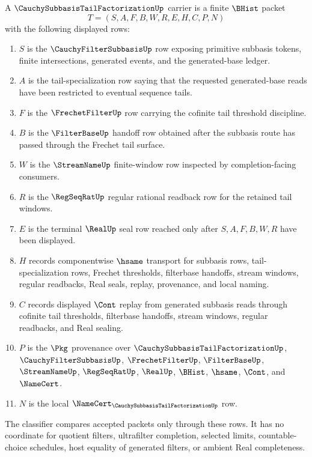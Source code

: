 \begin{definition}
\label{def:cauchy-subbasis-tail-factorization-carrier}
A $\CauchySubbasisTailFactorizationUp$ carrier is a finite $\BHist$ packet
$$
T=(S,A,F,B,W,R,E,H,C,P,N)
$$
with the following displayed rows:
\begin{enumerate}
\item $S$ is the $\CauchyFilterSubbasisUp$ row exposing primitive subbasis tokens, finite intersections, generated events, and the generated-base ledger.
\item $A$ is the tail-specialization row saying that the requested generated-base reads have been restricted to eventual sequence tails.
\item $F$ is the $\FrechetFilterUp$ row carrying the cofinite tail threshold discipline.
\item $B$ is the $\FilterBaseUp$ handoff row obtained after the subbasis route has passed through the Frechet tail surface.
\item $W$ is the $\StreamNameUp$ finite-window row inspected by completion-facing consumers.
\item $R$ is the $\RegSeqRatUp$ regular rational readback row for the retained tail windows.
\item $E$ is the terminal $\RealUp$ seal row reached only after $S,A,F,B,W,R$ have been displayed.
\item $H$ records componentwise $\hsame$ transport for subbasis rows, tail-specialization rows, Frechet thresholds, filterbase handoffs, stream windows, regular readbacks, Real seals, replay, provenance, and local naming.
\item $C$ records displayed $\Cont$ replay from generated subbasis reads through cofinite tail thresholds, filterbase handoffs, stream windows, regular readbacks, and Real sealing.
\item $P$ is the $\Pkg$ provenance over $\CauchySubbasisTailFactorizationUp$, $\CauchyFilterSubbasisUp$, $\FrechetFilterUp$, $\FilterBaseUp$, $\StreamNameUp$, $\RegSeqRatUp$, $\RealUp$, $\BHist$, $\hsame$, $\Cont$, and $\NameCert$.
\item $N$ is the local $\NameCert_{\CauchySubbasisTailFactorizationUp}$ row.
\end{enumerate}
The classifier compares accepted packets only through these rows. It has no coordinate for quotient filters, ultrafilter completion, selected limits, countable-choice schedules, host equality of generated filters, or ambient Real completeness.
\end{definition}

